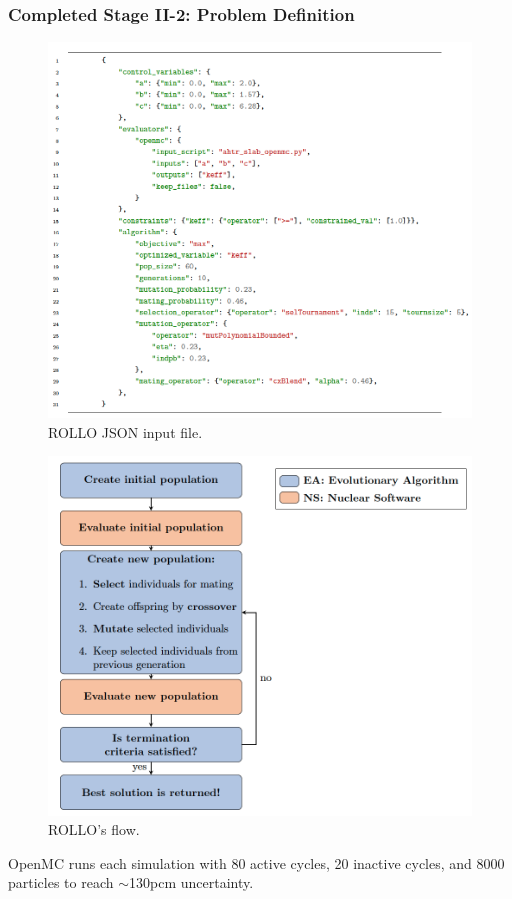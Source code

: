 \begin{frame}
    \frametitle{Completed Stage II-2: Problem Definition}
    \begin{minipage}[c]{0.6\textwidth}
    \begin{figure}
        \includegraphics[width=0.9\linewidth]{figures/ii2-rollo-input.png}
        \caption{ROLLO JSON input file.}
    \end{figure}
\end{minipage}\hfill
    \begin{minipage}[c]{0.4\textwidth}
        \centering
        \begin{figure}
            \includegraphics[width=\linewidth]{figures/rollo-flow.png} 
            \caption{ROLLO's flow.}
        \end{figure}
    \end{minipage}
    \scriptsize
    OpenMC runs each simulation with 80 active cycles, 20 inactive cycles, and 
    8000 particles to reach $\sim$130pcm uncertainty.
\end{frame}


